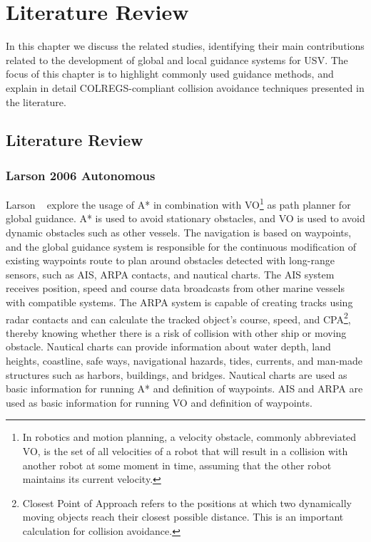\chapter{Literature Review \label{chap:3_LiteratureReview}}



    In this chapter we discuss the related studies, identifying their main contributions related to the development of global and local guidance systems for \ac{USV}. 
    The focus of this chapter is to highlight commonly used guidance methods, and explain in detail \ac{COLREGS}-compliant collision avoidance techniques presented in the literature.
    
    \section{Literature Review}

    \subsection{Larson 2006 Autonomous}
    Larson \etal~\cite{Larson2006Autonomous} explore the usage of A* in combination with \ac{VO}\footnote{In robotics and motion planning, a velocity obstacle, commonly abbreviated VO, is the set of all velocities of a robot that will result in a collision with another robot at some moment in time, assuming that the other robot maintains its current velocity.} \cite{Fiorini1998Motion} as path planner for global guidance. A* is used to avoid stationary obstacles, and \ac{VO} is used to avoid dynamic obstacles such as other vessels. The navigation is based on waypoints, and the global guidance system is responsible for the continuous modification of existing waypoints route to plan around obstacles detected with long-range sensors, such as \ac{AIS}, \ac{ARPA} contacts, and nautical charts. The \ac{AIS} system receives position, speed and course data broadcasts from other marine vessels with compatible systems. The \ac{ARPA} system is capable of creating tracks using radar contacts and can calculate the tracked object's course, speed, and \ac{CPA}\footnote{Closest Point of Approach refers to the positions at which two dynamically moving objects reach their closest possible distance. This is an important calculation for collision avoidance.}, thereby knowing whether there is a risk of collision with other ship or moving obstacle. Nautical charts can provide information about water depth, land heights, coastline, safe ways, navigational hazards, tides, currents, and man-made structures such as harbors, buildings, and bridges. Nautical charts are used as basic information for running A* and definition of waypoints. \ac{AIS} and \ac{ARPA} are used as basic information for running \ac{VO} and definition of waypoints.
    
